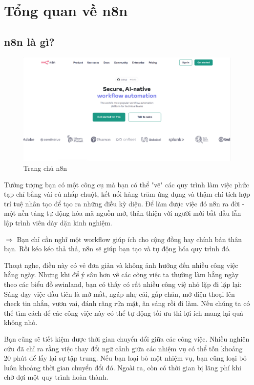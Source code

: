 \chapter{Tổng quan về n8n}

\section{n8n là gì?}

\begin{figure}[htbp]
    \centering
    \includegraphics[width=1\linewidth]{images/n8n.png}
    \caption{Trang chủ n8n}
\end{figure}

Tưởng tượng bạn có một công cụ mà bạn có thể "vẽ" các quy trình làm việc phức tạp chỉ bằng vài cú nhấp chuột, kết nối hàng trăm ứng dụng và thậm chí tích hợp trí tuệ nhân tạo để tạo ra những điều kỳ diệu. Để làm được việc đó n8n ra đời - một nền tảng tự động hóa mã nguồn mở, thân thiện với người mới bắt đầu lẫn lập trình viên dày dặn kinh nghiệm. 

$\Rightarrow$ Bạn chỉ cần nghĩ một workflow giúp ích cho cộng đồng hay chính bản thân bạn. Rồi kéo kéo thả thả, n8n sẽ giúp bạn tạo và tự động hóa quy trình đó.

\newpage
Thoạt nghe, điều này có vẻ đơn giản và không ảnh hưởng đến nhiều công việc hằng ngày. Nhưng khi để ý sâu hơn về các công việc ta thường làm hằng ngày theo các biểu đồ swinland, bạn có thấy có rất nhiều công việ nhỏ lặp đi lặp lại: Sáng dạy việc đầu tiên là mở mắt, ngáp nhẹ cái, gấp chăn, mở điện thoại lên check tin nhắn, vươn vai, đánh răng rửa mặt, ăn sáng rồi đi làm. Nếu chúng ta có thể tìm cách để các công việc này có thể tự động tối ưu thì lợi ích mang lại quả không nhỏ.

Bạn cũng sẽ tiết kiệm được thời gian chuyển đổi giữa các công việc. Nhiều nghiên cứu đã chỉ ra rằng việc thay đổi ngữ cảnh giữa các nhiệm vụ có thể tốn khoảng 20 phút để lấy lại sự tập trung. Nếu bạn loại bỏ một nhiệm vụ, bạn cũng loại bỏ luôn khoảng thời gian chuyển đổi đó. Ngoài ra, còn có thời gian bị lãng phí khi chờ đợi một quy trình hoàn thành.

